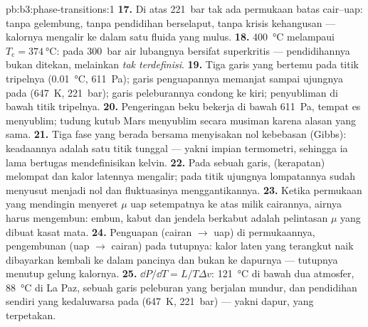 \begin{solution}{pb:b3:phase-transitions:1}
\textbf{17.} Di atas \qty{221}{bar} tak ada permukaan batas cair--uap:
tanpa gelembung, tanpa pendidihan berselaput, tanpa krisis kehangusan ---
kalornya mengalir ke dalam satu fluida yang mulus.
\textbf{18.} \qty{400}{\celsius} melampaui $T_{\text{c}} =
\qty{374}{\celsius}$: pada \qty{300}{bar} air lubangnya bersifat
superkritis --- pendidihannya bukan ditekan, melainkan
\emph{tak terdefinisi}.
\textbf{19.} Tiga garis yang bertemu pada titik tripelnya
(\qty{0.01}{\celsius}, \qty{611}{Pa}); garis penguapannya
memanjat sampai ujungnya pada (\qty{647}{K}, \qty{221}{bar}); garis
peleburannya condong ke kiri; penyubliman di bawah titik tripelnya.
\textbf{20.} Pengeringan beku bekerja di bawah \qty{611}{Pa}, tempat es
menyublim; tudung kutub Mars menyublim secara musiman karena alasan yang sama.
\textbf{21.} Tiga fase yang berada bersama menyisakan nol kebebasan
(Gibbs): keadaannya adalah satu titik tunggal --- yakni impian termometri,
sehingga ia lama bertugas mendefinisikan kelvin.
\textbf{22.} Pada sebuah garis,  (kerapatan)
melompat dan kalor latennya mengalir; pada titik ujungnya lompatannya
sudah menyusut menjadi nol dan fluktuasinya menggantikannya.
\textbf{23.} Ketika permukaan yang mendingin menyeret $\mu$ uap
setempatnya ke atas milik cairannya, airnya harus mengembun: embun, kabut
dan jendela berkabut adalah pelintasan $\mu$ yang dibuat kasat mata.
\textbf{24.} Penguapan (cairan $\to$ uap) di permukaannya,
pengembunan (uap $\to$ cairan) pada tutupnya: kalor laten yang
terangkut naik dibayarkan kembali ke dalam pancinya dan bukan ke dapurnya
--- tutupnya menutup gelung kalornya.
\textbf{25.} $\dd P/\dd T = L/T\Delta v$: \qty{121}{\celsius}
di bawah dua atmosfer, \qty{88}{\celsius} di La Paz, sebuah garis
peleburan yang berjalan mundur, dan pendidihan sendiri yang kedaluwarsa
pada (\qty{647}{K}, \qty{221}{bar}) --- yakni dapur, yang terpetakan.
\end{solution}
